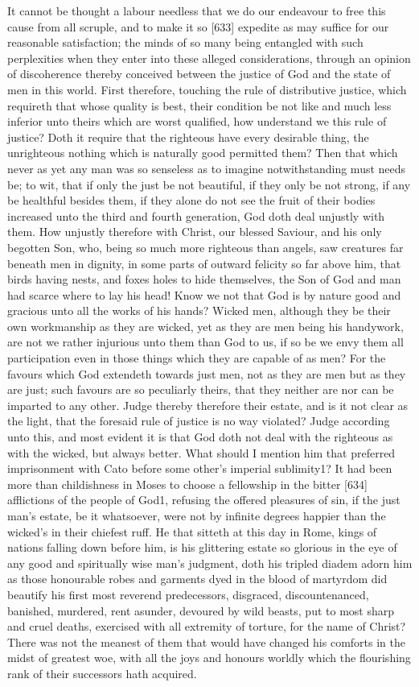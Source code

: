 It cannot be thought a labour needless that we do our endeavour to free this cause from all scruple, and to make it so [633] expedite as may suffice for our reasonable satisfaction; the minds of so many being entangled with such perplexities when they enter into these alleged considerations, through an opinion of discoherence thereby conceived between the justice of God and the state of men in this world. First therefore, touching the rule of distributive justice, which requireth that whose quality is best, their condition be not like and much less inferior unto theirs which are worst qualified, how understand we this rule of justice? Doth it require that the righteous have every desirable thing, the unrighteous nothing which is naturally good permitted them? Then that which never as yet any man was so senseless as to imagine notwithstanding must needs be; to wit, that if only the just be not beautiful, if they only be not strong, if any be healthful besides them, if they alone do not see the fruit of their bodies increased unto the third and fourth generation, God doth deal unjustly with them. How unjustly therefore with Christ, our blessed Saviour, and his only begotten Son, who, being so much more righteous than angels, saw creatures far beneath men in dignity, in some parts of outward felicity so far above him, that birds having nests, and foxes holes to hide themselves, the Son of God and man had scarce where to lay his head! Know we not that God is by nature good and gracious unto all the works of his hands? Wicked men, although they be their own workmanship as they are wicked, yet as they are men being his handywork, are not we rather injurious unto them than God to us, if so be we envy them all participation even in those things which they are capable of as men? For the favours which God extendeth towards just men, not as they are men but as they are just; such favours are so peculiarly theirs, that they neither are nor can be imparted to any other. Judge thereby therefore their estate, and is it not clear as the light, that the foresaid rule of justice is no way violated? Judge according unto this, and most evident it is that God doth not deal with the righteous as with the wicked, but always better. What should I mention him that preferred imprisonment with Cato before some other’s imperial sublimity1? It had been more than childishness in Moses to choose a fellowship in the bitter [634] afflictions of the people of God1, refusing the offered pleasures of sin, if the just man’s estate, be it whatsoever, were not by infinite degrees happier than the wicked’s in their chiefest ruff. He that sitteth at this day in Rome, kings of nations falling down before him, is his glittering estate so glorious in the eye of any good and spiritually wise man’s judgment, doth his tripled diadem adorn him as those honourable robes and garments dyed in the blood of martyrdom did beautify his first most reverend predecessors, disgraced, discountenanced, banished, murdered, rent asunder, devoured by wild beasts, put to most sharp and cruel deaths, exercised with all extremity of torture, for the name of Christ? There was not the meanest of them that would have changed his comforts in the midst of greatest woe, with all the joys and honours worldly which the flourishing rank of their successors hath acquired.

